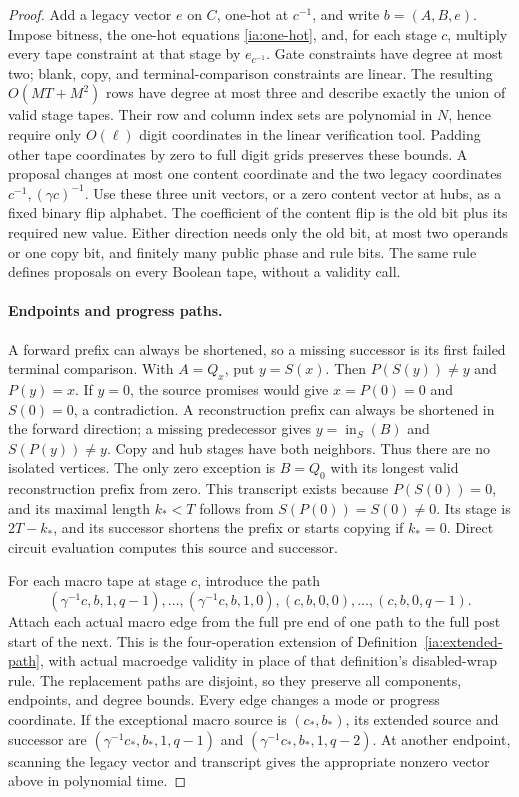 \begin{proof}
Add a legacy vector \(e\) on \(C\), one-hot at \(c^{-1}\), and
write \(b=(A,B,e)\). Impose bitness, the one-hot equations
\eqref{ia:one-hot}, and, for each stage \(c\), multiply every tape
constraint at that stage by \(e_{c^{-1}}\). Gate constraints have
degree at most two; blank, copy, and terminal-comparison constraints
are linear. The resulting \(O(MT+M^2)\) rows have degree at most
three and describe exactly the union of valid stage tapes. Their row and
column index sets are polynomial in \(N\), hence require only
\(O(\ell)\) digit coordinates in the linear verification tool.
Padding other tape coordinates by zero to full digit grids preserves
these bounds. A proposal changes at most one content coordinate and the
two legacy coordinates \(c^{-1},(\gamma c)^{-1}\). Use these three
unit vectors, or a zero content vector at hubs, as a fixed binary
flip alphabet. The coefficient of the content flip is the old bit
plus its required new value. Either direction needs only the old
bit, at most two operands or one copy bit, and finitely many public
phase and rule bits. The same rule defines proposals on every
Boolean tape, without a validity call.

\paragraph{Endpoints and progress paths.}
A forward prefix can always be shortened, so a missing successor
is its first failed terminal comparison. With \(A=Q_x\), put
\(y=S(x)\). Then \(P(S(y))\ne y\) and \(P(y)=x\). If \(y=0\),
the source promises would give \(x=P(0)=0\) and \(S(0)=0\), a
contradiction. A reconstruction prefix can always be shortened in
the forward direction; a missing predecessor gives
\(y=\operatorname{in}_S(B)\) and \(S(P(y))\ne y\). Copy and hub
stages have both neighbors. Thus there are no isolated vertices.
The only zero exception is \(B=Q_0\) with its longest valid
reconstruction prefix from zero. This transcript exists because
\(P(S(0))=0\), and its maximal length \(k_*<T\) follows from
\(S(P(0))=S(0)\ne0\). Its stage is \(2T-k_*\), and its successor
shortens the prefix or starts copying if \(k_*=0\). Direct circuit
evaluation computes this source and successor.

For each macro tape at stage \(c\), introduce the path
\[
 (\gamma^{-1}c,b,1,q-1),\ldots,(\gamma^{-1}c,b,1,0),
 (c,b,0,0),\ldots,(c,b,0,q-1).
\]
Attach each actual macro edge from the full pre end of one path
to the full post start of the next. This is the four-operation
extension of Definition~\ref{ia:extended-path}, with actual
macroedge validity in place of that definition's disabled-wrap
rule. The replacement paths are disjoint, so they preserve all
components, endpoints, and degree bounds. Every edge changes a
mode or progress coordinate. If the exceptional macro source is
\((c_*,b_*)\), its extended source and successor are
\((\gamma^{-1}c_*,b_*,1,q-1)\) and
\((\gamma^{-1}c_*,b_*,1,q-2)\). At another endpoint, scanning the
legacy vector and transcript gives the appropriate nonzero vector
above in polynomial time.


\end{proof}
